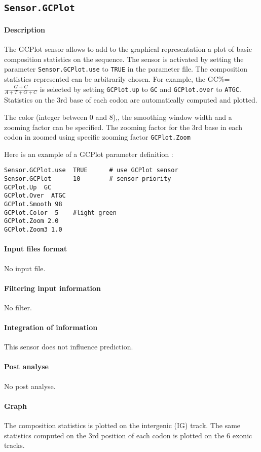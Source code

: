 
\subsection{\texttt{Sensor.GCPlot}}

\paragraph{Description}

The GCPlot sensor allows to add to the graphical representation a plot
of basic composition statistics on the sequence. The sensor is
activated by setting the parameter \texttt{Sensor.GCPlot.use} to
\texttt{TRUE} in the parameter file. The composition statistics
represented can be arbitrarily chosen. For example, the
GC\%=$\frac{G+C}{A+T+G+C}$ is selected by setting \texttt{GCPlot.up}
to \texttt{GC} and \texttt{GCPlot.over} to \texttt{ATGC}. Statistics
on the 3rd base of each codon are automatically computed and plotted.

The color (integer between 0 and 8),, the smoothing window width and a
zooming factor can be specified. The zooming factor for the 3rd base
in each codon in zoomed using specific zooming factor
\texttt{GCPlot.Zoom}

Here is an example of a GCPlot parameter definition :
\begin{Verbatim}[fontsize=\small]
Sensor.GCPlot.use  TRUE      # use GCPlot sensor
Sensor.GCPlot      10        # sensor priority
GCPlot.Up  GC
GCPlot.Over  ATGC
GCPlot.Smooth 98
GCPlot.Color  5    #light green
GCPlot.Zoom 2.0
GCPlot.Zoom3 1.0
\end{Verbatim}

\paragraph{Input files format}

No input file.

\paragraph{Filtering input information}

No filter.

\paragraph{Integration of information}

This sensor does not influence prediction.

\paragraph{Post analyse}

No post analyse.

\paragraph{Graph}

The composition statistics is plotted on the intergenic (IG) track.
The same statistics computed on the 3rd position of each codon is
plotted on the 6 exonic tracks.

